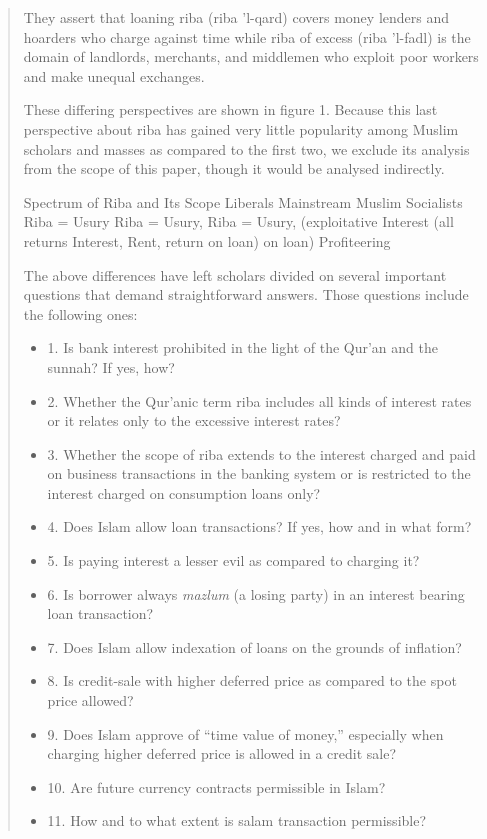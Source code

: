 \begin{quote}
They assert that loaning riba (riba 'l-qard) covers money lenders and hoarders who charge against time while riba of excess (riba 'l-fadl) is the domain of landlords, merchants, and middlemen who exploit poor workers and make unequal exchanges. 

These differing perspectives are shown in figure 1. Because this last perspective about riba has gained very little popularity among Muslim scholars and masses as compared to the first two, we exclude its analysis from the scope of this paper, though it would be analysed indirectly.


Spectrum of Riba and Its Scope Liberals Mainstream Muslim Socialists Riba = Usury Riba = Usury, Riba = Usury, (exploitative Interest (all returns Interest, Rent, return on loan) on loan) Profiteering






The above differences have left scholars divided on several important questions that demand straightforward answers. Those questions include the following ones:
\begin{itemize}
    \item 
1. Is bank interest prohibited in the light of the Qur'an and the sunnah? If yes, how?
    \item 
2. Whether the Qur'anic term riba includes all kinds of interest rates or it relates only to the excessive interest rates?
    \item 
3. Whether the scope of riba extends to the interest charged and paid on business transactions in the banking system or is restricted to the interest charged on consumption loans only?
    \item 
4. Does Islam allow loan transactions? If yes, how and in what form?
    \item 
5. Is paying interest a lesser evil as compared to charging it?
    \item 
6. Is borrower always \textit{mazlum} (a losing party) in an interest bearing loan transaction?
    \item 
7. Does Islam allow indexation of loans on the grounds of inflation?
    \item 
8. Is credit-sale with higher deferred price as compared to the spot price allowed?
    \item 
9. Does Islam approve of “time value of money,” especially when charging higher deferred price is allowed in a credit sale?
    \item 
10. Are future currency contracts permissible in Islam?
    \item 
11. How and to what extent is salam transaction permissible?
\end{itemize}



\end{quote}
